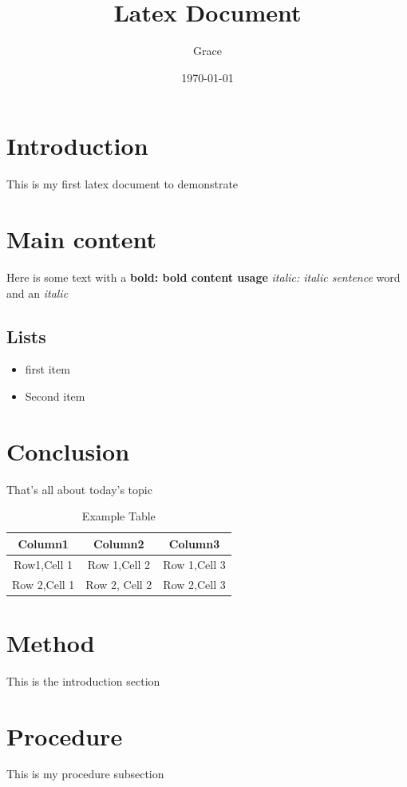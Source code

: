 \documentclass{article}
\begin{document}
	\title{Latex Document}
	\author{Grace}
	\date{\today}
	\maketitle
	
	\section{Introduction}\label{sec:intro}
	This is my first latex document to demonstrate
	
	\section{Main content}
	Here is some text with a \textbf{bold: bold content usage}
	\textit{italic: italic sentence}
	word and an \emph{italic}
	\subsection{Lists}
	\begin{itemize}
		\item first item
		\item Second item
	\end{itemize}
	\section{Conclusion}
	That's all about today's topic
	\begin{table}[h]
		\centering 
		\begin{tabular}{|c|c|c|}
			\hline
			\textbf{Column1}&\textbf{Column2}&\textbf{Column3}\\
			\hline
			Row1,Cell 1 & Row 1,Cell 2 & Row 1,Cell 3\\
			\hline
			Row 2,Cell 1 & Row 2, Cell 2 & Row 2,Cell 3\\
			\hline
		\end{tabular}
		\caption{Example Table}
		\label{tab:example}
    \end{table}
    \section{Method}\label{sec:method}
    This is the introduction section
    
    \section{Procedure}\label{subsec:procedure}
    This is my procedure subsection
    
\end{document}

